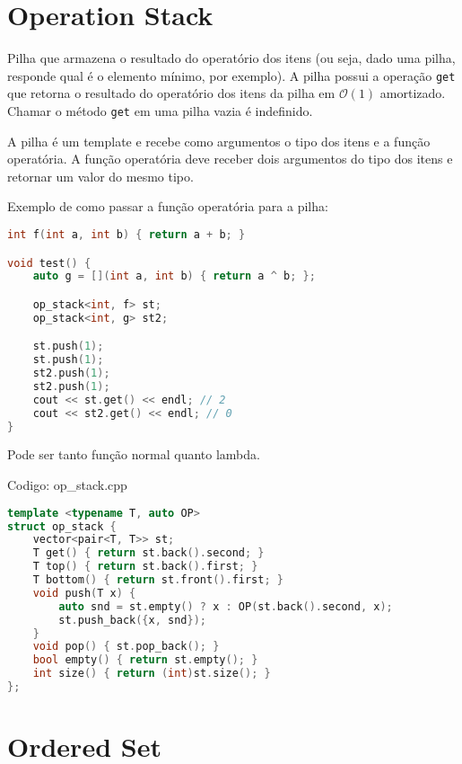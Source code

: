 \documentclass[10pt, a4paper, oneside]{book}
\begin{document}
\section{Operation Stack}


Pilha que armazena o resultado do operatório dos itens (ou seja, dado uma pilha, responde qual é o elemento mínimo, por exemplo). A pilha possui a operação \texttt{get} que retorna o resultado do operatório dos itens da pilha em $\mathcal{O}(1)$ amortizado. Chamar o método \texttt{get} em uma pilha vazia é indefinido.



A pilha é um template e recebe como argumentos o tipo dos itens e a função operatória. A função operatória deve receber dois argumentos do tipo dos itens e retornar um valor do mesmo tipo.



Exemplo de como passar a função operatória para a pilha:

    

\begin{lstlisting}[language=C++]
int f(int a, int b) { return a + b; }

void test() {
    auto g = [](int a, int b) { return a ^ b; };

    op_stack<int, f> st;
    op_stack<int, g> st2;

    st.push(1);
    st.push(1);
    st2.push(1);
    st2.push(1);
    cout << st.get() << endl; // 2
    cout << st2.get() << endl; // 0
}
\end{lstlisting}



Pode ser tanto função normal quanto lambda.
\hfill

Codigo: op\_stack.cpp

\begin{lstlisting}[language=C++]
template <typename T, auto OP>
struct op_stack {
    vector<pair<T, T>> st;
    T get() { return st.back().second; }
    T top() { return st.back().first; }
    T bottom() { return st.front().first; }
    void push(T x) {
        auto snd = st.empty() ? x : OP(st.back().second, x);
        st.push_back({x, snd});
    }
    void pop() { st.pop_back(); }
    bool empty() { return st.empty(); }
    int size() { return (int)st.size(); }
};\end{lstlisting}
\hfill

\section{Ordered Set}
\end{document}
